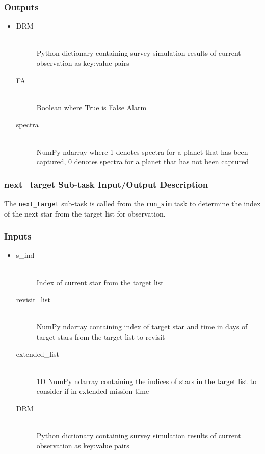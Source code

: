 \documentclass[cleanfoot]{asme2ej}
\begin{document}
\subsubsection*{Outputs}
\begin{itemize}
    \item 
    \begin{description}
        \item[DRM] \hfill \\
        Python dictionary containing survey simulation results of current observation as key:value pairs
        \item[FA] \hfill \\
        Boolean where True is False Alarm
        \item[spectra] \hfill \\
        NumPy ndarray where 1 denotes spectra for a planet that has been captured, 0 denotes spectra for a planet that has not been captured
    \end{description}
\end{itemize}

\subsubsection{next\_target Sub-task Input/Output Description} \label{sec:nexttargettask}
The \verb+next_target+ sub-task is called from the \verb+run_sim+ task to determine the index of the next star from the target list for observation.

\subsubsection*{Inputs}
\begin{itemize}
    \item 
    \begin{description}
        \item[s\_ind] \hfill \\
        Index of current star from the target list
        \item[revisit\_list] \hfill \\
        NumPy ndarray containing index of target star and time in days of target stars from the target list to revisit
        \item[extended\_list] \hfill \\
        1D NumPy ndarray containing the indices of stars in the target list to consider if in extended mission time
        \item[DRM] \hfill \\
        Python dictionary containing survey simulation results of current observation as key:value pairs
    \end{description}
\end{itemize}
\end{document}

